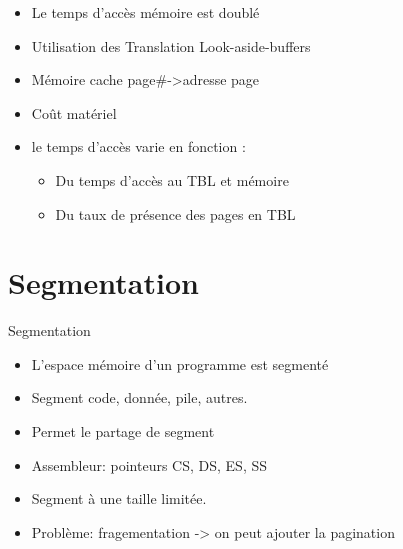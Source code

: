 \begin{frame}{\sectitle}
\begin{block}{\subsectitle}
\begin{itemize}
    \item Le temps d'accès mémoire est doublé
\end{itemize}
\end{block}

\begin{block}{\subsectitle}
\begin{itemize}
    \item Utilisation des Translation Look-aside-buffers
    \item Mémoire cache page\#->adresse page
    \item Coût matériel
    \item le temps d'accès varie en fonction :
    \begin{itemize}
        \item Du temps d'accès au TBL et mémoire
        \item Du taux de présence des pages en TBL
    \end{itemize}
\end{itemize}
\end{block}
\end{frame}

\def\sectitle{Segmentation}
\section{\sectitle}
\begin{frame}{\sectitle}
\begin{block}{\subsectitle}
\begin{itemize}
    \item L'espace mémoire d'un programme est segmenté
    \item Segment code, donnée, pile, autres.
    \item Permet le partage de segment
    \item Assembleur: pointeurs CS, DS, ES, SS
    \item Segment à une taille limitée.
    \item Problème: fragementation -> on peut ajouter la pagination
\end{itemize}
\end{block}
\end{frame}

\def\sectitle{Mémoire paginée et segmentée}
